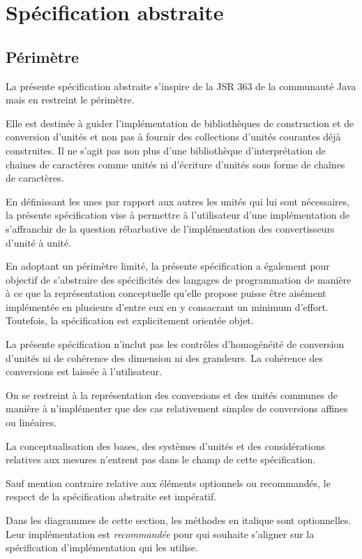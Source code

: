 \documentclass[a4paper,draft,twoside,10pt]{article}
\begin{document}
\section{Spécification abstraite}

\subsection{Périmètre}

La présente spécification abstraite s'inspire de la JSR 363 de la communauté Java mais en restreint le périmètre.

Elle est destinée à guider l'implémentation de bibliothèques de construction et de conversion d'unités et non pas à 
fournir des collections d'unités courantes déjà construites. Il ne s'agit pas non plus d'une bibliothèque 
d'interprétation de chaines de caractères comme unités ni d'écriture d'unités sous forme de chaînes de caractères.

En définissant les unes par rapport aux autres les unités qui lui sont nécessaires, la présente spécification vise à
permettre à l'utilisateur d'une implémentation de s'affranchir de la question rébarbative de l'implémentation des
convertisseurs d'unité à unité.

En adoptant un périmètre limité, la présente spécification a également pour objectif de s'abstraire des spécificités des
langages de programmation de manière à ce que la représentation conceptuelle qu'elle propose puisse être aisément
implémentée en plusieurs d'entre eux en y consacrant un minimum d'effort. Toutefois, la spécification est explicitement
orientée objet.

La présente spécification n'inclut pas les contrôles d'homogénéité de conversion d'unités ni de cohérence des dimension
ni des grandeurs. La cohérence des conversions est laissée à l'utilisateur.

On se restreint à la représentation des conversions et des unités communes de manière à n'implémenter que des cas
relativement simples de conversions affines ou linéaires.

La conceptualisation des bases, des systèmes d'unités et des considérations relatives aux mesures n'entrent pas dans
le champ de cette spécification.

Sauf mention contraire relative aux éléments optionnels ou recommandés, le respect de la spécification abstraite est
impératif.

Dans les diagrammes de cette section, les méthodes en italique sont optionnelles. Leur implémentation est
\emph{recommandée} pour qui souhaite s'aligner sur la spécification d'implémentation qui les utilise.
\end{document}
